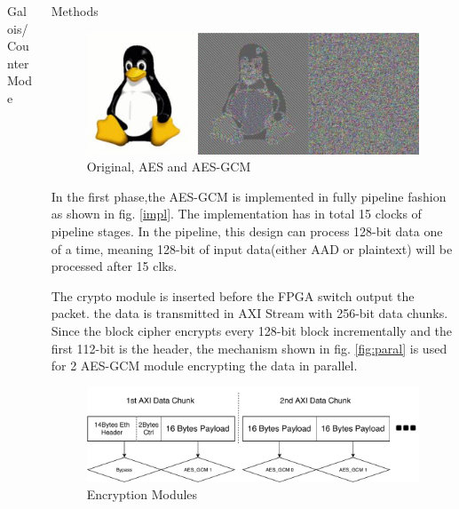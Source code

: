 \documentclass[final]{beamer}
\newlength{\onecolwid}
\newlength{\twocolwid}
\begin{document}
\begin{frame}[t]
\begin{columns}[t]
\begin{column}{\twocolwid}
\begin{columns}[t,totalwidth=\twocolwid]
\begin{column}{\onecolwid}
\begin{block}{Galois/Counter Mode}
\end{block}


\end{column} %

\begin{column}{\onecolwid}\vspace{-.6in} %



\begin{block}{Methods}

\begin{figure}
\includegraphics[width=\linewidth]{poster/aes_gcm.png}
\caption{Original, AES and AES-GCM}
\label{fig:modes}
\end{figure}


In the first phase,the AES-GCM is implemented in fully pipeline fashion as shown in fig. \ref{impl}. The implementation has in total 15 clocks of pipeline stages. In the pipeline, this design can process 128-bit data one of a time, meaning 128-bit of input data(either AAD or plaintext) will be processed after 15 clks. 

The crypto module  is inserted before the FPGA switch output the packet. the data is transmitted in AXI Stream with 256-bit data chunks. Since the block cipher encrypts every 128-bit block incrementally and the first 112-bit is the header, the mechanism shown in fig. \ref{fig:paral} is used for 2 AES-GCM module encrypting the data in parallel.


\begin{figure}
\includegraphics[width=\linewidth]{poster/crypto.pdf}
\caption{Encryption Modules}


\end{figure}
\end{block}
\end{column}
\end{columns}
\end{column}
\end{columns}
\end{frame}
\end{document}
